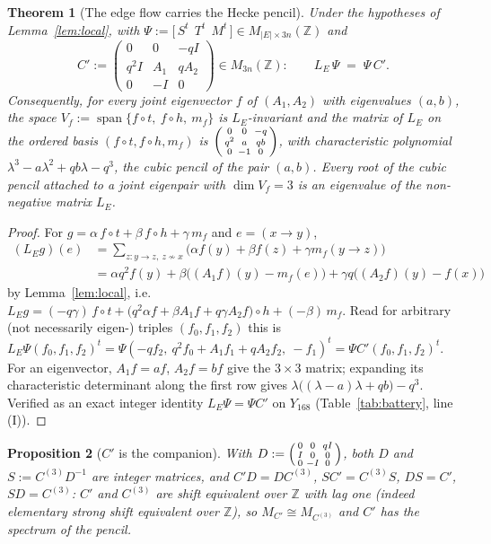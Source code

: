 \documentclass[11pt]{amsart}
\numberwithin{equation}{section}
\newtheorem{theorem}{Theorem}[section]
\newtheorem{proposition}[theorem]{Proposition}
\theoremstyle{definition}
\theoremstyle{remark}
\newcommand{\Z}{\mathbb{Z}}
\newcommand{\Cthree}{C^{(3)}}
\newcommand{\LE}{L_{E}}
\begin{document}
\begin{theorem}[The edge flow carries the Hecke pencil]\label{thm:edge}
Under the hypotheses of Lemma~\ref{lem:local}, with
$\Psi:=\bigl[\,S^{t}\ \ T^{t}\ \ M^{t}\,\bigr]\in M_{|E|\times3n}(\Z)$ and
\[
C':=\begin{pmatrix}0&0&-qI\\ q^{2}I&A_1&qA_2\\ 0&-I&0\end{pmatrix}\in M_{3n}(\Z):
\qquad
\LE\,\Psi\;=\;\Psi\,C' .
\]
Consequently, for every joint eigenvector $f$ of $(A_1,A_2)$ with eigenvalues $(a,b)$, the
space $V_f:=\operatorname{span}\{f\circ t,\ f\circ h,\ m_f\}$ is $\LE$-invariant and the matrix
of $\LE$ on the ordered basis $(f\circ t,f\circ h,m_f)$ is
$\begin{psmallmatrix}0&0&-q\\ q^{2}&a&qb\\ 0&-1&0\end{psmallmatrix}$, with characteristic
polynomial $\lambda^{3}-a\lambda^{2}+qb\lambda-q^{3}$, the cubic pencil of the pair $(a,b)$.
Every root of the
cubic pencil attached to a joint eigenpair with $\dim V_f=3$ is an eigenvalue of the
non-negative matrix $\LE$.
\end{theorem}

\begin{proof}
For $g=\alpha\,f\circ t+\beta\,f\circ h+\gamma\,m_f$ and $e=(x\to y)$,
\begin{align*}
(\LE g)(e)&=\sum_{z\colon y\to z,\ z\not\sim x}\bigl(\alpha f(y)+\beta f(z)+\gamma m_f(y\to z)\bigr)\\
&=\alpha q^{2}f(y)+\beta\bigl((A_1f)(y)-m_f(e)\bigr)+\gamma q\bigl((A_2f)(y)-f(x)\bigr)
\end{align*}
by Lemma~\ref{lem:local}, i.e.\ $\LE g=(-q\gamma)\,f\circ t+\bigl(q^{2}\alpha f+\beta A_1f
+q\gamma A_2f\bigr)\circ h+(-\beta)\,m_f$. Read for arbitrary (not necessarily eigen-)
triples $(f_0,f_1,f_2)$ this is $\LE\Psi(f_0,f_1,f_2)^{t}=\Psi(-qf_2,\ q^{2}f_0+A_1f_1+qA_2f_2,
\ -f_1)^{t}=\Psi C'(f_0,f_1,f_2)^{t}$. For an eigenvector, $A_1f=af$, $A_2f=bf$ give the
$3\times3$ matrix; expanding its characteristic determinant along the first row gives
$\lambda\bigl((\lambda-a)\lambda+qb\bigr)-q^{3}$. Verified as an exact integer identity
$\LE\Psi=\Psi C'$ on $Y_{168}$ (Table~\ref{tab:battery}, line (I)).
\end{proof}

\begin{proposition}[$C'$ is the companion]\label{prop:Cprime}
With $D:=\begin{psmallmatrix}0&0&qI\\ I&0&0\\0&-I&0\end{psmallmatrix}$, both $D$ and
$S:=\Cthree D^{-1}$ are integer matrices, and $C'D=D\Cthree$, $S C'=\Cthree S$, $DS=C'$,
$SD=\Cthree$: $C'$ and $\Cthree$ are shift equivalent over $\Z$ with lag one (indeed
elementary strong shift equivalent over $\Z$), so $M_{C'}\cong M_{\Cthree}$ and $C'$ has the
spectrum of the pencil.
\end{proposition}
\end{document}
